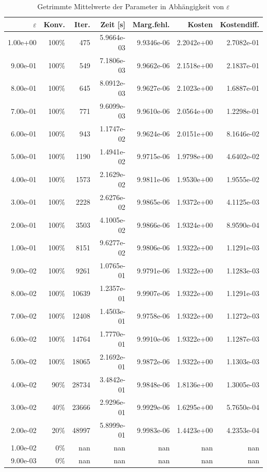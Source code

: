 \begin{table}[htbp]
\caption{Getrimmte Mittelwerte der Parameter in Abhängigkeit von $\varepsilon$}
\label{tab:Parametertest64_1}
\small
\centering
{}
\begin{tabular}{rrrrrrr}
\toprule
$\varepsilon$ & Konv. & Iter. & Zeit [s] & Marg.fehl. & Kosten & Kostendiff. \\
\midrule
1.00e+00 & 100\% & 475 & 5.9664e-03 & 9.9346e-06 & 2.2042e+00 & 2.7082e-01 \\
9.00e-01 & 100\% & 549 & 7.1806e-03 & 9.9662e-06 & 2.1518e+00 & 2.1837e-01 \\
8.00e-01 & 100\% & 645 & 8.0912e-03 & 9.9627e-06 & 2.1023e+00 & 1.6887e-01 \\
7.00e-01 & 100\% & 771 & 9.6099e-03 & 9.9610e-06 & 2.0564e+00 & 1.2298e-01 \\
6.00e-01 & 100\% & 943 & 1.1747e-02 & 9.9624e-06 & 2.0151e+00 & 8.1646e-02 \\
5.00e-01 & 100\% & 1190 & 1.4941e-02 & 9.9715e-06 & 1.9798e+00 & 4.6402e-02 \\
4.00e-01 & 100\% & 1573 & 2.1629e-02 & 9.9811e-06 & 1.9530e+00 & 1.9555e-02 \\
3.00e-01 & 100\% & 2228 & 2.6276e-02 & 9.9865e-06 & 1.9372e+00 & 4.1125e-03 \\
2.00e-01 & 100\% & 3503 & 4.1005e-02 & 9.9866e-06 & 1.9324e+00 & 8.9590e-04 \\
1.00e-01 & 100\% & 8151 & 9.6277e-02 & 9.9806e-06 & 1.9322e+00 & 1.1291e-03 \\
9.00e-02 & 100\% & 9261 & 1.0765e-01 & 9.9791e-06 & 1.9322e+00 & 1.1283e-03 \\
8.00e-02 & 100\% & 10639 & 1.2357e-01 & 9.9907e-06 & 1.9322e+00 & 1.1291e-03 \\
7.00e-02 & 100\% & 12408 & 1.4503e-01 & 9.9758e-06 & 1.9322e+00 & 1.1272e-03 \\
6.00e-02 & 100\% & 14764 & 1.7770e-01 & 9.9910e-06 & 1.9322e+00 & 1.1287e-03 \\
5.00e-02 & 100\% & 18065 & 2.1692e-01 & 9.9872e-06 & 1.9322e+00 & 1.1303e-03 \\
4.00e-02 & 90\% & 28734 & 3.4842e-01 & 9.9848e-06 & 1.8136e+00 & 1.3005e-03 \\
3.00e-02 & 40\% & 23666 & 2.9296e-01 & 9.9929e-06 & 1.6295e+00 & 5.7650e-04 \\
2.00e-02 & 20\% & 48997 & 5.8999e-01 & 9.9983e-06 & 1.4423e+00 & 4.2353e-04 \\
1.00e-02 & 0\% & nan & nan & nan & nan & nan \\
9.00e-03 & 0\% & nan & nan & nan & nan & nan \\
\bottomrule
\end{tabular}
\end{table}
